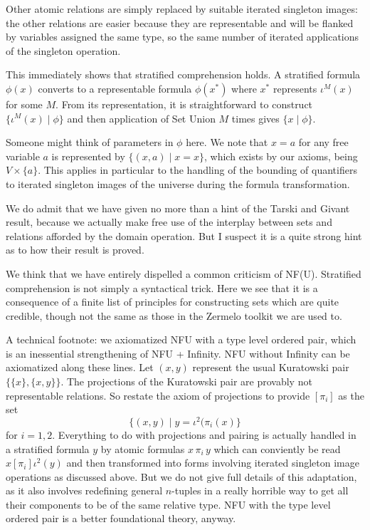 \documentclass{slides}
\begin{document}
\begin{slide}
Other atomic relations are simply replaced by suitable iterated singleton images:  the other relations are easier because they are representable and will be flanked by variables assigned the same type, so the same number of iterated applications of the singleton operation.

\end{slide}
\begin{slide}
This immediately shows that stratified comprehension holds.  A stratified formula $\phi(x)$ converts to a representable formula
$\phi(x^*)$ where $x^*$ represents $\iota^M(x)$ for some $M$.  From its representation, it is straightforward to construct $\{\iota^M(x)\mid \phi\}$ and then application of Set Union
$M$ times gives $\{x\mid \phi\}$.

Someone might think of parameters in $\phi$ here.  We note that $x=a$ for any free variable $a$ is represented by $\{(x,a)\mid x=x\}$, which exists by our axioms, being $V \times \{a\}$.  This applies in particular to the handling of the bounding of quantifiers to iterated singleton images of the universe during the formula transformation.
\end{slide}

\begin{slide}
We do admit that we have given no more than a hint of the Tarski and Givant result, because we actually make free use of the interplay
between sets and relations afforded by the domain operation.  But I suspect it is a quite strong hint as to how their result is proved.

We think that we have entirely dispelled a common criticism of NF(U).  Stratified comprehension is not simply a syntactical trick.  Here we see that it is a consequence of a finite list of principles for constructing sets which are quite credible, though not the same as those in the Zermelo toolkit we are used to.

\end{slide}
\begin{slide}

A technical footnote:  we axiomatized NFU with a type level ordered pair, which is an inessential strengthening of NFU + Infinity.  NFU without Infinity can be axiomatized along these lines.  Let $(x,y)$ represent the usual Kuratowski pair
$\{\{x\},\{x,y\}\}$.  The projections of the Kuratowski pair are provably not representable relations.
So restate the axiom of projections to provide $[\pi_i]$ as the set $$\{(x,y)\mid y = \iota^2(\pi_i(x)\}$$ for $i=1,2$.  Everything to do with projections and pairing is actually handled in a stratified formula $y$ by atomic formulas $x \,\pi_i\,y$ which can conviently be read $x [\pi_i] \iota^2(y)$ and then transformed into forms involving iterated singleton image operations as discussed above.  But we do not give full details of this adaptation, as it also involves redefining general $n$-tuples in a really horrible way to get all their components to be of the same relative type.   NFU with the type level ordered pair is a better foundational theory, anyway.

\end{slide}
\end{document}
